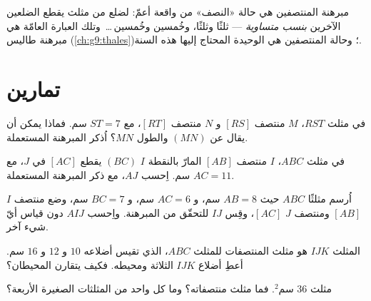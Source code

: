 \begin{remark}
مبرهنة المنتصفين هي حالة «النصف» من واقعة أعمّ:
  لضلع من مثلث يقطع الضلعين الآخرين
\emph{بنسب متساوية} --- ثلثًا وثلثًا، وخُمسين
وخُمسين\,\dots\ وتلك العبارة العامّة هي مبرهنة طاليس
(\cref{ch:g9:thales})؛ وحالة المنتصفين هي الوحيدة المحتاج إليها هذه
السنة.
\end{remark}

\section{تمارين}

\begin{exercise}[$\star$]\label{exo:g8:midpoints:1}
في مثلث $RST$، $M$ منتصف $[RS]$ و $N$
منتصف $[RT]$، مع $ST = 7$ سم. فماذا يمكن أن يقال عن 
$(MN)$ والطول $MN$؟ اُذكر المبرهنة المستعملة.
\end{exercise}

\begin{exercise}[$\star$]\label{exo:g8:midpoints:2}
في مثلث $ABC$، $I$ منتصف $[AB]$ 
المارّ بالنقطة $I$   $(BC)$ يقطع $[AC]$ في $J$، مع
$AC = 11$ سم. اِحسب $AJ$، مع ذكر المبرهنة المستعملة.
\end{exercise}

\begin{exercise}[$\star$]\label{exo:g8:midpoints:3}
اُرسم مثلثًا $ABC$ حيث $AB = 8$ سم، و $AC = 6$ سم، و $BC = 7$ سم،
وضع منتصف $I$  $[AB]$ ومنتصف $J$  $[AC]$، وقِس $IJ$
للتحقّق من المبرهنة. واِحسب  $AIJ$ دون
قياس أيّ شيء آخر.
\end{exercise}

\begin{exercise}[$\star$]\label{exo:g8:midpoints:4}
المثلث $IJK$ هو مثلث المنتصفات للمثلث $ABC$، الذي تقيس أضلاعه $10$
و $12$ و $16$ سم. أعطِ أضلاع $IJK$ الثلاثة ومحيطه.
فكيف يتقارن المحيطان؟
\end{exercise}

\begin{exercise}[$\star$]\label{exo:g8:midpoints:5}
 مثلث $36$ سم$^2$. فما  مثلث
منتصفاته؟ وما  كل واحد من المثلثات الصغيرة الأربعة؟
\end{exercise}


